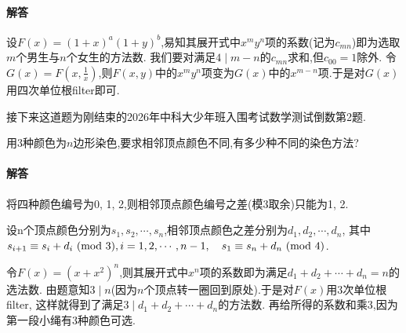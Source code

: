 \documentclass{article}
\begin{document}
\paragraph{解答} 设$F(x) = (1 + x)^a (1 + y)^b$,易知其展开式中$x^my^n$项的系数(记为$c_{mn}$)即为选取$m$个男生与$n$个女生的方法数.
我们要对满足$4 \mid m - n$的$c_{mn}$求和,但$c_{00} = 1$除外.
令$G(x) = F(x, \frac{1}{x})$,则$F(x, y)$中的$x^my^n$项变为$G(x)$中的$x^{m - n}$项.于是对$G(x)$用四次单位根filter即可.

接下来这道题为刚结束的2026年中科大少年班入围考试数学测试倒数第2题.

\begin{exer}
    用3种颜色为$n$边形染色,要求相邻顶点颜色不同,有多少种不同的染色方法?
\end{exer}

\paragraph{解答} 将四种颜色编号为0, 1, 2,则相邻顶点颜色编号之差(模3取余)只能为1, 2.

设n个顶点颜色分别为$s_1, s_2, \cdots, s_n$,相邻顶点颜色之差分别为$d_1, d_2, \cdots, d_n$,
其中$s_{i + 1} \equiv s_i + d_i \ (\mathrm{mod}\ 3), i = 1, 2, \cdots, n - 1, \quad s_1 \equiv s_n + d_n \ (\mathrm{mod}\ 4)$.

令$F(x) = (x + x^2)^n$,则其展开式中$x^n$项的系数即为满足$d_1 + d_2 + \cdots + d_n = n$的选法数.
由题意知$3 \mid n$(因为$n$个顶点转一圈回到原处).于是对$F(x)$用3次单位根filter,
这样就得到了满足$3 \mid d_1 + d_2 + \cdots + d_n$的方法数.
再给所得的系数和乘3,因为第一段小绳有3种颜色可选.
\end{document}
